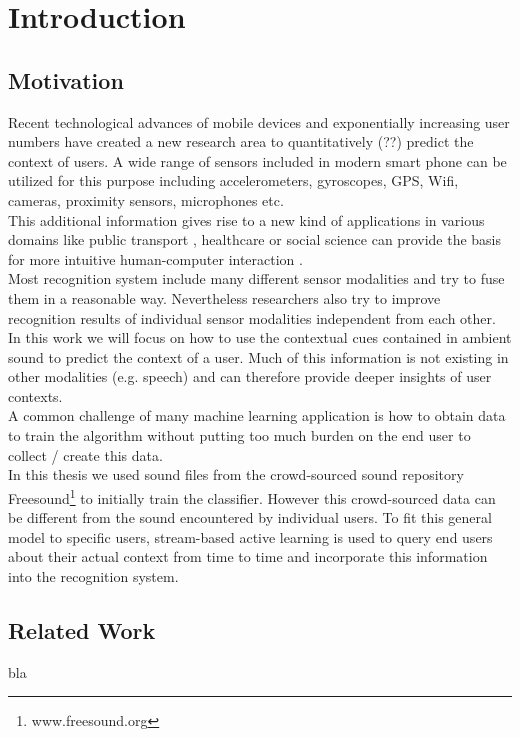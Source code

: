 \chapter{Introduction}\label{cha1}
\section{Motivation}
Recent technological advances of mobile devices and exponentially increasing user numbers have created a new research area to quantitatively (??) predict the context of users. A wide range of sensors included in modern smart phone can be utilized for this purpose including accelerometers, gyroscopes, GPS, Wifi, cameras, proximity sensors, microphones etc.\\
This additional information gives rise to a new kind of applications in various domains like public transport \cite{Thiagarajan2014}, healthcare \cite{Bricon-Souf2007} or social science \cite{Eagle2005} can provide the basis for more intuitive human-computer interaction \cite{Schmidt1999}.\\
Most recognition system include many different sensor modalities and try to fuse them in a reasonable way. Nevertheless researchers also try to improve recognition results of individual sensor modalities independent from each other.\\
In this work we will focus on how to use the contextual cues contained in ambient sound to predict the context of a user. Much of this information is not existing in other modalities (e.g. speech) and can therefore provide deeper insights of user contexts.\\
A common challenge of many machine learning application is how to obtain data to train the algorithm without putting too much burden on the end user to collect / create this data.\\
In this thesis we used sound files from the crowd-sourced sound repository Freesound\footnote{www.freesound.org} to initially train the classifier. However this crowd-sourced data can be different from the sound encountered by individual users. To fit this general model to specific users, stream-based active learning is used to query end users about their actual context from time to time and incorporate this information into the recognition system. 


\section{Related Work}\label{relatedWork}
bla

